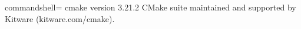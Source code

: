 \begin{tcblisting}{commandshell={}}
cmake version 3.21.2
CMake suite maintained and supported by Kitware (kitware.com/cmake).
\end{tcblisting}








































































